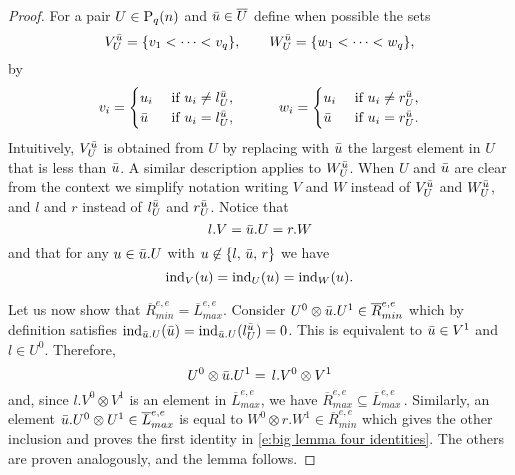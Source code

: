 \begin{proof}
	For a pair $U \in \P_q(n)$ and $\bu \in \overline{U}$ define when possible the sets
	\begin{equation*}
	V^\bu_U = \{v_1 < \cdots < v_q\}, \qquad W_U^\bu = \{w_1 < \cdots < w_q\},
	\end{equation*}
	by
	\begin{align*}
	v_i =
	\begin{cases}
	u_i & \text{ if } u_i \neq l_U^\bu, \\
	\bu	& \text{ if } u_i = l_U^\bu,
	\end{cases}
	\qquad \quad
	w_i =
	\begin{cases}
	u_i & \text{ if } u_i \neq r_U^\bu, \\
	\bu	& \text{ if } u_i = r_U^\bu.
	\end{cases}
	\end{align*}
	Intuitively, $V_U^\bu$ is obtained from $U$ by replacing with $\bu$ the largest element in $U$ that is less than $\bu$.
	A similar description applies to $W_U^\bu$.
	When $U$ and $\bu$ are clear from the context we simplify notation writing $V$ and $W$ instead of $V^\bu_U$ and $W^\bu_U$, and $l$ and $r$ instead of $l_U^\bu$ and $r_U^\bu$.
	Notice that
	\begin{equation*}
	l.V = \bu.U = r.W
	\end{equation*}
	and that for any $u \in \bu.U$ with $u \not \in \{l,\, \bu,\, r\}$ we have
	\begin{equation*}
	\ind_{V}(u) = \ind_{U}(u) = \ind_{W}(u).
	\end{equation*}

	Let us now show that $\overline{R}_{min}^{e,e} = \overline{L}_{max}^{e,e}$.
	Consider $U^0 \otimes \bu.U^1 \in \overline{R}_{min}^{e, e}$ which by definition satisfies $\ind_{\bu.U}(\bu) = \ind_{\bu.U}(l_{U}^\bu) = 0$.
	This is equivalent to $\bu \in V^1$ and $l \in U^0$.
	Therefore,
	\begin{equation*}
	U^0 \otimes \bu.U^1 = \, l.V^0 \otimes V^1
	\end{equation*}
	and, since $l.V^0 \otimes V^1$ is an element in $\overline{L}_{max}^{e,e}$, we have $\overline{R}_{max}^{e,e} \subseteq \overline{L}_{max}^{e,e}$\,.
	Similarly, an element $\bu.U^0 \otimes U^1 \in \overline{L}_{max}^{e,e}$ is equal to $W^0 \otimes r.W^1 \in \overline{R}_{min}^{e,e}$ which gives the other inclusion and proves the first identity in \eqref{e:big lemma four identities}.
	The others are proven analogously, and the lemma follows.
\end{proof}

